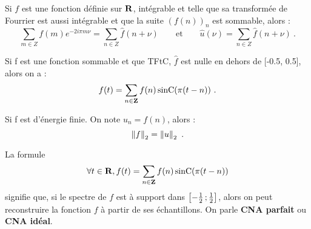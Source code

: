 \begin{thm}
	Si $f$ est une fonction définie sur $\mathbf{R}$, intégrable et telle que sa transformée de Fourrier est aussi intégrable et que la suite $(f(n))_n$ est sommable, alors :
	$$\sum_{m\in Z} f(m)e^{-2i\pi m\nu } = \sum_{n\in Z} \hat{f}(n+\nu )
	\qquad \text{et} \qquad
	\hat{u}(\nu ) = \sum_{n\in Z} \hat{f}(n+\nu )\ .$$
\end{thm}

\begin{thm}
	Si f est une fonction sommable et que TFtC, $\hat{f}$ est nulle en dehors de [-0.5, 0.5], alors on a :
	$$f(t)=\sum_{n\in \Z} f(n) \sinC (\pi (t-n))\ .$$
\end{thm}

\begin{thm}
	Si f est d'énergie finie. On note $u_{n}=f(n)$, alors :
	$$\norme{f}_{2} = \norme{u}_{2}\ .$$
\end{thm}

\begin{defn} La formule
	$$\forall t \in \mathbf{R}, f(t) = \sum_{n\in \mathbf{Z}} f(n) \operatorname{sinC} (\pi (t-n))$$
	signifie que, si le spectre de $f$ est à support dans $\mathopen{}\mathclose{\left[-\frac{1}{2}\mathclose{}\mathpunct{};\frac{1}{2}\right]}$, alors on peut reconstruire la fonction $f$ à partir de ses échantillons.
	On parle \textbf{CNA parfait} ou \textbf{CNA idéal}.
\end{defn}
